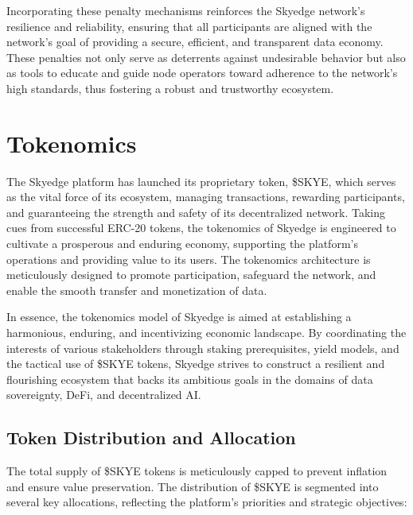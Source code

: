 \documentclass{article}
\begin{document}
Incorporating these penalty mechanisms reinforces the Skyedge network's resilience and reliability, ensuring that all participants are aligned with the network's goal of providing a secure, efficient, and transparent data economy. These penalties not only serve as deterrents against undesirable behavior but also as tools to educate and guide node operators toward adherence to the network's high standards, thus fostering a robust and trustworthy ecosystem.


\pagebreak

\section{Tokenomics}
The Skyedge platform has launched its proprietary token, \$SKYE, which serves as the vital force of its ecosystem, managing transactions, rewarding participants, and guaranteeing the strength and safety of its decentralized network. Taking cues from successful ERC-20 tokens, the tokenomics of Skyedge is engineered to cultivate a prosperous and enduring economy, supporting the platform's operations and providing value to its users. The tokenomics architecture is meticulously designed to promote participation, safeguard the network, and enable the smooth transfer and monetization of data. 

In essence, the tokenomics model of Skyedge is aimed at establishing a harmonious, enduring, and incentivizing economic landscape. By coordinating the interests of various stakeholders through staking prerequisites, yield models, and the tactical use of \$SKYE tokens, Skyedge strives to construct a resilient and flourishing ecosystem that backs its ambitious goals in the domains of data sovereignty, DeFi, and decentralized AI.


\subsection{Token Distribution and Allocation}
The total supply of \$SKYE tokens is meticulously capped to prevent inflation and ensure value preservation. The distribution of \$SKYE is segmented into several key allocations, reflecting the platform's priorities and strategic objectives:
\end{document}

